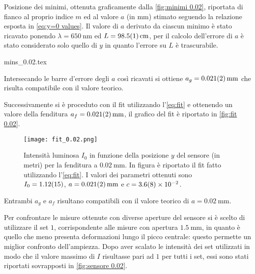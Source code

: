 \documentclass[../main.tex]{subfiles}
\begin{document}
\begin{table}[ht!]
    \centering
    \caption{Posizione dei minimi, ottenuta graficamente dalla \autoref{fig:minimi 0.02}, riportata di fianco al proprio indice $m$ ed al valore $a$ (in $\si{\mm}$) stimato seguendo la relazione esposta in \autoref{eq:y=0 values}. Il valore di $a$ derivato da ciascun minimo è stato ricavato ponendo $\lambda = \qty{650}{\nm}$ ed $L = \qty{98.5+-0.1}{\cm}$, per il calcolo dell'errore di $a$ è stato considerato solo quello di $y$ in quanto l'errore su $L$ è trascurabile.}
    {mins_0.02.tex}
    \label{tab:minimi 0.02}
\end{table}

Intersecando le barre d'errore degli $a$ così ricavati si ottiene $a_g = \qty{0.021+-0.002}{\mm}$ che risulta compatibile con il valore teorico.


\newpage

Successivamente si è proceduto con il fit utilizzando l'\autoref{eq:fit} e ottenendo un valore della fenditura $a_f = \qty{0.021+-0.002}{\mm}$, il grafico del fit è riportato in \autoref{fig:fit 0.02}.

\begin{figure}[ht!]
    \centering
    \texttt{[image: fit\_0.02.png]}
    \caption{Intensità luminosa $I_{0}$ in funzione della posizione $y$ del sensore (in metri) per la fenditura a $\qty{0.02}{\mm}$. In figura è riportato il fit fatto utilizzando l'\autoref{eq:fit}. I valori dei parametri ottenuti sono $I_{0} = \num{1.12+-0.15}$, $a = \qty{0.021+-0.002}{\mm}$ e $c = \num{3.6+-0.8e-2}$.}
    \label{fig:fit 0.02}
\end{figure}

Entrambi $a_g$ e $a_f$ risultano compatibili con il valore teorico di $a = \qty{0.02}{\mm}$.

\newpage

Per confrontare le misure ottenute con diverse aperture del sensore si è scelto di utilizzare il set $1$, corrispondente alle misure con apertura $\qty{1.5}{\mm}$, in quanto è quello che meno presenta deformazioni lungo il picco centrale: questo permette un miglior confronto dell'ampiezza. Dopo aver scalato le intensità dei set utilizzati in modo che il valore massimo di $I$ risultasse pari ad $1$ per tutti i set, essi sono stati riportati sovrapposti in \autoref{fig:sensore 0.02}.
\end{document}
